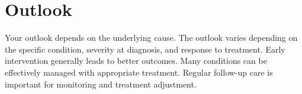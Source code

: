 \section{Outlook}
Your outlook depends on the underlying cause. The outlook varies depending on the specific condition, severity at diagnosis, and response to treatment. Early intervention generally leads to better outcomes. Many conditions can be effectively managed with appropriate treatment. Regular follow-up care is important for monitoring and treatment adjustment.
